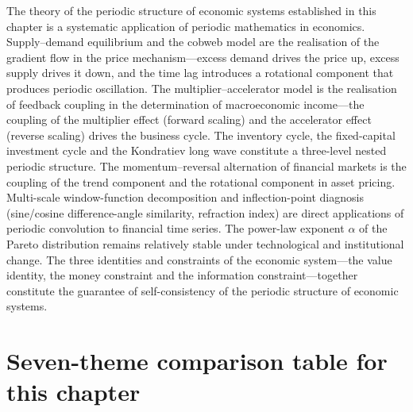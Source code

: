 \begin{remark}
The theory of the periodic structure of economic systems established in this chapter is a systematic application of periodic mathematics in economics. Supply--demand equilibrium and the cobweb model are the realisation of the gradient flow in the price mechanism---excess demand drives the price up, excess supply drives it down, and the time lag introduces a rotational component that produces periodic oscillation. The multiplier--accelerator model is the realisation of feedback coupling in the determination of macroeconomic income---the coupling of the multiplier effect (forward scaling) and the accelerator effect (reverse scaling) drives the business cycle. The inventory cycle, the fixed-capital investment cycle and the Kondratiev long wave constitute a three-level nested periodic structure. The momentum--reversal alternation of financial markets is the coupling of the trend component and the rotational component in asset pricing. Multi-scale window-function decomposition and inflection-point diagnosis (sine/cosine difference-angle similarity, refraction index) are direct applications of periodic convolution to financial time series. The power-law exponent $\alpha$ of the Pareto distribution remains relatively stable under technological and institutional change. The three identities and constraints of the economic system---the value identity, the money constraint and the information constraint---together constitute the guarantee of self-consistency of the periodic structure of economic systems.
\end{remark}

\section*{Seven-theme comparison table for this chapter}

